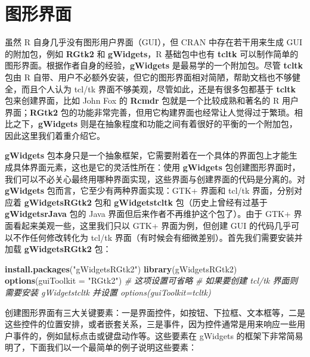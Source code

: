 \documentclass[
  b5paper,
  UTF8,twoside]{book}
\newenvironment{Shaded}{\begin{snugshade}}{\end{snugshade}}
\newcommand{\AttributeTok}[1]{\textcolor[rgb]{0.13,0.29,0.53}{#1}}
\newcommand{\CommentTok}[1]{\textcolor[rgb]{0.56,0.35,0.01}{\textit{#1}}}
\newcommand{\FunctionTok}[1]{\textcolor[rgb]{0.13,0.29,0.53}{\textbf{#1}}}
\newcommand{\NormalTok}[1]{#1}
\newcommand{\StringTok}[1]{\textcolor[rgb]{0.31,0.60,0.02}{#1}}
\begin{document}
\chapter{图形界面}\label{cha:GUI}

虽然 R 自身几乎没有图形用户界面（GUI），但 CRAN 中存在若干用来生成 GUI 的附加包，例如 \textbf{RGtk2} 和 \textbf{gWidgets}，R 基础包中也有 \textbf{tcltk} 可以制作简单的图形界面。根据作者自身的经验，\textbf{gWidgets} 是最易学的一个附加包。尽管 \textbf{tcltk} 包由 R 自带、用户不必额外安装，但它的图形界面相对简陋，帮助文档也不够健全，而且个人认为 tcl/tk 界面不够美观，尽管如此，还是有很多包都基于 \textbf{tcltk} 包来创建界面，比如 John Fox 的 \textbf{Rcmdr} \citep{Rcmdr} 包就是一个比较成熟和著名的 R 用户界面；\textbf{RGtk2} 包的功能非常完善，但用它构建界面也经常让人觉得过于繁琐。相比之下，\textbf{gWidgets} 则是在抽象程度和功能之间有着很好的平衡的一个附加包，因此这里我们着重介绍它。

\textbf{gWidgets} 包本身只是一个抽象框架，它需要附着在一个具体的界面包上才能生成具体界面元素，这也是它的灵活性所在：使用 \textbf{gWidgets} 包创建图形界面时，我们可以不必关心最终用哪种界面实现，这些界面与创建界面的代码是分离的。对 \textbf{gWidgets} 包而言，它至少有两种界面实现：GTK+ 界面和 tcl/tk 界面，分别对应着 \textbf{gWidgetsRGtk2} 包和 \textbf{gWidgetstcltk} 包（历史上曾经有过基于 \textbf{gWidgetsrJava} 包的 Java 界面但后来作者不再维护这个包了）。由于 GTK+ 界面看起来美观一些，这里我们只以 GTK+ 界面为例，但创建 GUI 的代码几乎可以不作任何修改转化为 tcl/tk 界面（有时候会有细微差别）。首先我们需要安装并加载 \textbf{gWidgetsRGtk2} 包：

\begin{Shaded}
\begin{Highlighting}[]
\FunctionTok{install.packages}\NormalTok{(}\StringTok{"gWidgetsRGtk2"}\NormalTok{)}
\FunctionTok{library}\NormalTok{(gWidgetsRGtk2)}
\FunctionTok{options}\NormalTok{(}\AttributeTok{guiToolkit =} \StringTok{"RGtk2"}\NormalTok{) }\CommentTok{\# 这项设置可省略}
\CommentTok{\# 如果要创建 tcl/tk 界面则需要安装 gWidgetstcltk 并设置 options(guiToolkit=\textquotesingle{}tcltk\textquotesingle{})}
\end{Highlighting}
\end{Shaded}

创建图形界面有三大关键要素：一是界面控件，如按钮、下拉框、文本框等，二是这些控件的位置安排，或者嵌套关系，三是事件，因为控件通常是用来响应一些用户事件的，例如鼠标点击或键盘动作等。这些要素在 gWidgets 的框架下非常简易明了，下面我们以一个最简单的例子说明这些要素：
\end{document}
